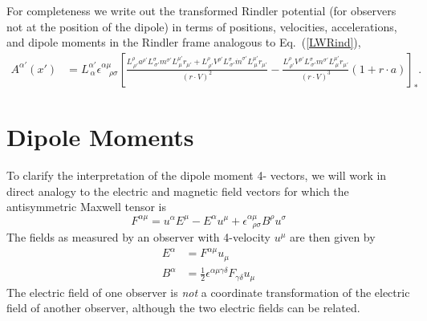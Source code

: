 \begin{widetext}
For completeness we write out the transformed Rindler potential (for observers not at the position of the dipole) in terms of positions, velocities, accelerations, and dipole moments in the Rindler frame analogous to Eq.\ (\ref{LWRind}),
\begin{align}
A^{\alpha'} (x') &=  L^{\alpha'}_{\ \alpha} \epsilon^{\alpha \mu}_{\quad \rho
    \sigma} \left[ \frac{ L^{\rho}_{\ \rho'} a^{\rho'} L^{\sigma}_{\ \sigma'} m^{\sigma'} L^{\mu'}_{\ \mu}  r_{\mu'} + L^{\rho}_{\ \rho'} V^{\rho'} 
  L^{\sigma}_{\ \sigma'} \dot{m}^{\sigma'} L^{\mu'}_{\ \mu}  r_{\mu'} }{(r\cdot V)^2}  -  \frac{ L^{\rho}_{\ \rho'} V^{\rho'} L^{\sigma}_{\ \sigma'} m^{\sigma'} L^{\mu'}_{\ \mu} r_{\mu'}}{(r\cdot V)^3} (1+r\cdot a)  \right]_{*} .
  \label{DpoleSolnRind}
\end{align}


\end{widetext}


\section{Dipole Moments}
\label{DipoleMoments}

To clarify the interpretation of the dipole moment 4- vectors, we will
work in direct analogy to the electric and magnetic field vectors for
which the antisymmetric Maxwell tensor is
\begin{equation}
F^{\alpha \mu}=u^\alpha E^\mu - E^\alpha u^\mu +\epsilon^{\alpha
  \mu}_{\ \ \ \rho \sigma} B^\rho u^\sigma
\end{equation}
The fields as measured by an observer with 4-velocity $u^\mu$ are then
given by
\begin{align}
E^\alpha & = F^{\alpha \mu} u_\mu \nonumber \\
B^\alpha & = \frac{1}{2} \epsilon^{\alpha \mu \gamma \delta} F_{\gamma
  \delta} u_{\mu}
\end{align}
The electric field of one observer is {\it not} a coordinate transformation
of the electric field of another observer, although the two electric
fields can be related.

